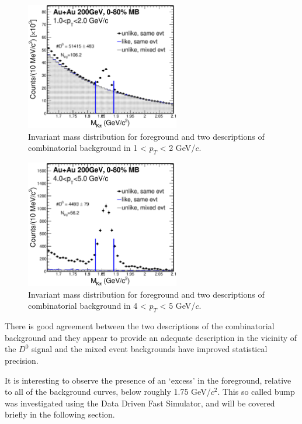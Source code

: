 \begin{figure}[htbp]
\centering
\includegraphics[keepaspectratio,width=0.6\textwidth]{figure/Run14_D0HFT/Mixed_cent_1_9_pt_1_2.eps}
\caption{Invariant mass distribution for foreground and two descriptions of combinatorial background in 1 < $p_T$ < 2 GeV/$c$.}
\label{fig:mixedEvent_pt1_2}
\end{figure}

\begin{figure}[htbp]
\centering
\includegraphics[keepaspectratio,width=0.6\textwidth]{figure/Run14_D0HFT/Mixed_cent_1_9_pt_4_5.eps}
\caption{Invariant mass distribution for foreground and two descriptions of combinatorial background in 4 < $p_T$ < 5 GeV/$c$.}
\label{fig:mixedEvent_pt4_5}
\end{figure}

There is good agreement between the two descriptions of the combinatorial background and they appear to provide an adequate description in the vicinity of the $D^0$ signal and the mixed event backgrounds have improved statistical precision.

It is interesting to observe the presence of an `excess' in the foreground, relative to all of the background curves, below roughly 1.75 GeV/$c^2$.  This so called bump was investigated using the Data Driven Fast Simulator, and will be covered briefly in the following section.

